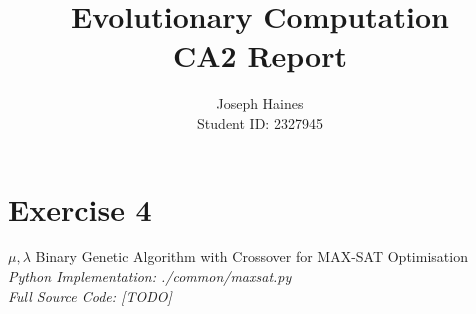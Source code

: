 \documentclass[11pt,a4paper]{article}
\begin{document}
\title{Evolutionary Computation\\CA2 Report}
\author{
Joseph Haines\\
\small{Student ID: 2327945}
}

\maketitle


\section*{Exercise 4}
\label{sec:exercise-4}



$\mu,\lambda$ Binary Genetic Algorithm with Crossover for MAX-SAT Optimisation \\
\textit{Python Implementation: ./common/maxsat.py} \\
\textit{Full Source Code: [TODO]} \\
\end{document}
